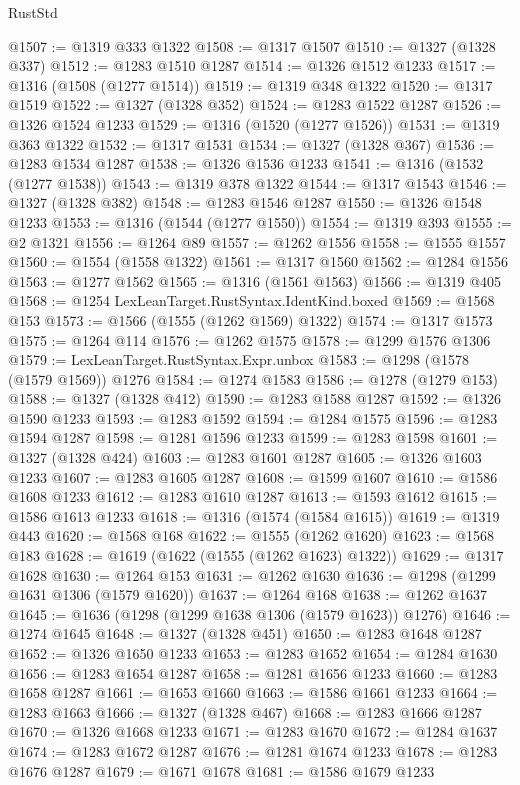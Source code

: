 \begin{lexlean}{RustStd}
\begin{coremodule}
@1507 := @1319 @333 @1322
@1508 := @1317 @1507
@1510 := @1327 (@1328 @337)
@1512 := @1283 @1510 @1287
@1514 := @1326 @1512 @1233
@1517 := @1316 (@1508 (@1277 @1514))
@1519 := @1319 @348 @1322
@1520 := @1317 @1519
@1522 := @1327 (@1328 @352)
@1524 := @1283 @1522 @1287
@1526 := @1326 @1524 @1233
@1529 := @1316 (@1520 (@1277 @1526))
@1531 := @1319 @363 @1322
@1532 := @1317 @1531
@1534 := @1327 (@1328 @367)
@1536 := @1283 @1534 @1287
@1538 := @1326 @1536 @1233
@1541 := @1316 (@1532 (@1277 @1538))
@1543 := @1319 @378 @1322
@1544 := @1317 @1543
@1546 := @1327 (@1328 @382)
@1548 := @1283 @1546 @1287
@1550 := @1326 @1548 @1233
@1553 := @1316 (@1544 (@1277 @1550))
@1554 := @1319 @393
@1555 := @2 @1321
@1556 := @1264 @89
@1557 := @1262 @1556
@1558 := @1555 @1557
@1560 := @1554 (@1558 @1322)
@1561 := @1317 @1560
@1562 := @1284 @1556
@1563 := @1277 @1562
@1565 := @1316 (@1561 @1563)
@1566 := @1319 @405
@1568 := @1254 LexLeanTarget.RustSyntax.IdentKind.boxed
@1569 := @1568 @153
@1573 := @1566 (@1555 (@1262 @1569) @1322)
@1574 := @1317 @1573
@1575 := @1264 @114
@1576 := @1262 @1575
@1578 := @1299 @1576 @1306
@1579 := LexLeanTarget.RustSyntax.Expr.unbox
@1583 := @1298 (@1578 (@1579 @1569)) @1276
@1584 := @1274 @1583
@1586 := @1278 (@1279 @153)
@1588 := @1327 (@1328 @412)
@1590 := @1283 @1588 @1287
@1592 := @1326 @1590 @1233
@1593 := @1283 @1592
@1594 := @1284 @1575
@1596 := @1283 @1594 @1287
@1598 := @1281 @1596 @1233
@1599 := @1283 @1598
@1601 := @1327 (@1328 @424)
@1603 := @1283 @1601 @1287
@1605 := @1326 @1603 @1233
@1607 := @1283 @1605 @1287
@1608 := @1599 @1607
@1610 := @1586 @1608 @1233
@1612 := @1283 @1610 @1287
@1613 := @1593 @1612
@1615 := @1586 @1613 @1233
@1618 := @1316 (@1574 (@1584 @1615))
@1619 := @1319 @443
@1620 := @1568 @168
@1622 := @1555 (@1262 @1620)
@1623 := @1568 @183
@1628 := @1619 (@1622 (@1555 (@1262 @1623) @1322))
@1629 := @1317 @1628
@1630 := @1264 @153
@1631 := @1262 @1630
@1636 := @1298 (@1299 @1631 @1306 (@1579 @1620))
@1637 := @1264 @168
@1638 := @1262 @1637
@1645 := @1636 (@1298 (@1299 @1638 @1306 (@1579 @1623)) @1276)
@1646 := @1274 @1645
@1648 := @1327 (@1328 @451)
@1650 := @1283 @1648 @1287
@1652 := @1326 @1650 @1233
@1653 := @1283 @1652
@1654 := @1284 @1630
@1656 := @1283 @1654 @1287
@1658 := @1281 @1656 @1233
@1660 := @1283 @1658 @1287
@1661 := @1653 @1660
@1663 := @1586 @1661 @1233
@1664 := @1283 @1663
@1666 := @1327 (@1328 @467)
@1668 := @1283 @1666 @1287
@1670 := @1326 @1668 @1233
@1671 := @1283 @1670
@1672 := @1284 @1637
@1674 := @1283 @1672 @1287
@1676 := @1281 @1674 @1233
@1678 := @1283 @1676 @1287
@1679 := @1671 @1678
@1681 := @1586 @1679 @1233

\end{coremodule}
\end{lexlean}
